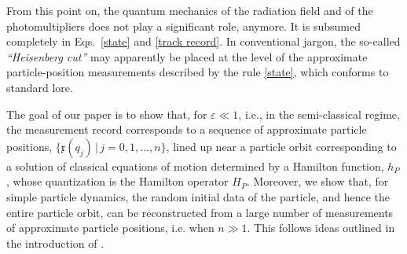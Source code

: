 \documentclass[11pt]{article}
\begin{document}
From this point on, the quantum mechanics of the radiation field and of the photomultipliers does not play a significant 
role, anymore. It is subsumed completely in Eqs.~\eqref{state} and \eqref{track record}. In conventional jargon, the 
so-called \textit{``Heisenberg cut''} may apparently be placed at the level of the approximate particle-position 
measurements described by the rule \eqref{state}, which conforms to standard lore.

The goal of our paper is to show that, for $\varepsilon \ll 1$, i.e., in the semi-classical regime, 
the measurement record corresponds to a sequence of approximate particle positions, 
$\big\{\mathfrak{x}(q_j)\,\big|\, j=0,1,...,n\big\}$, lined up near a particle orbit corresponding to a solution of
classical equations of motion determined by a Hamilton function, $h_P$, whose quantization is the Hamilton 
operator $H_P$. Moreover, we show that, for simple particle dynamics, the random initial data of the particle, and 
hence the entire particle orbit, can be reconstructed from a large number of measurements of approximate particle 
positions, i.e. when $n \gg 1$. This follows ideas outlined in the introduction of \cite{BBFF}. 
\end{document}

